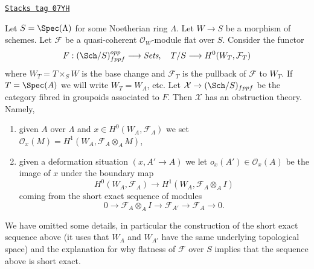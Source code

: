 \begin{example}
\label{artin-example-global-sections}
\href{https://stacks.math.columbia.edu/tag/07YH}{\texttt{Stacks tag 07YH}}

Let $S = \Spec(\Lambda)$ for some Noetherian ring $\Lambda$.
Let $W \to S$ be a morphism of schemes. Let $\mathcal{F}$
be a quasi-coherent $\mathcal{O}_W$-module flat over $S$.
Consider the functor
$$
F : (\Sch/S)_{fppf}^{opp} \longrightarrow \textit{Sets},
\quad
T/S \longrightarrow H^0(W_T, \mathcal{F}_T)
$$
where $W_T = T \times_S W$ is the base change and $\mathcal{F}_T$ is
the pullback of $\mathcal{F}$ to $W_T$. If $T = \Spec(A)$
we will write $W_T = W_A$, etc. Let $\mathcal{X} \to (\Sch/S)_{fppf}$
be the category fibred in groupoids associated to $F$. Then
$\mathcal{X}$ has an obstruction theory. Namely,
\begin{enumerate}
\item given $A$ over $\Lambda$ and
$x \in H^0(W_A, \mathcal{F}_A)$ we set
$\mathcal{O}_x(M) = H^1(W_A, \mathcal{F}_A \otimes_A M)$,
\item given a deformation situation $(x, A' \to A)$ we let
$o_x(A') \in \mathcal{O}_x(A)$ be the image of $x$ under the boundary map
$$
H^0(W_A, \mathcal{F}_A) \longrightarrow H^1(W_A, \mathcal{F}_A \otimes_A I)
$$
coming from the short exact sequence of modules
$$
0 \to \mathcal{F}_A \otimes_A I \to
\mathcal{F}_{A'} \to \mathcal{F}_A \to 0.
$$
\end{enumerate}
We have omitted some details, in particular the construction of the short
exact sequence above (it uses that $W_A$ and $W_{A'}$ have the same
underlying topological space) and the explanation for why flatness
of $\mathcal{F}$ over $S$ implies that the sequence above is short exact.
\end{example}

